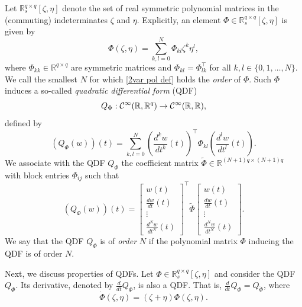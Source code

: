 \documentclass[letterpaper, 10 pt, conference]{ieeeconf}
\theoremstyle{ieeeconf}
\newcommand{\R}{\mathbb{R}}
\begin{document}
Let $\R_s^{q \times q}[\zeta,\eta]$ denote the set of real symmetric polynomial matrices in the (commuting) indeterminates $\zeta$ and $\eta$. Explicitly, an element $\Phi 
\in \R_s^{q \times q}[\zeta,\eta]$ is given by 
\begin{equation}
\Phi(\zeta,\eta)=\sum_{k,l=0}^N\Phi_{kl}\zeta^k\eta^l,
\label{2var pol def}
\end{equation}
where $\Phi_{kk}\in \R^{q \times q}$ are symmetric matrices and $\Phi_{kl}=\Phi_{lk}^\top$ for all ${k,l \in \{0,1,\dots,N\}}$. We call the smallest $N$ for which \eqref{2var pol def} holds
the \emph{order} of $\Phi$. Such $\Phi$ induces a so-called \emph{quadratic differential form} (QDF)
\begin{equation*}
Q_\Phi : \mathcal{C}^\infty (\R,\R^{q}) \to \mathcal{C}^\infty (\R,\R),
\vspace{-1ex}
\end{equation*}
defined by 
\vspace{-1ex}
\begin{equation*}
\left( Q_\Phi(w)\right)(t)=\sum_{k,l=0}^N \left(\frac{d^kw}{dt^k}(t)\right)^\top \Phi_{kl} \left(\frac{d^lw}{dt^l}(t)\right).
\end{equation*}
We associate with the QDF $Q_\Phi$ 
the coefficient matrix ${\tilde{\Phi}\in \R^{(N+1)q \times (N+1)q}}$ with block entries $\Phi_{ij}$
such that \vspace{-0.5ex}
\begin{equation*}
\left(Q_\Phi(w)\right)(t) =  \begin{bmatrix}
	w(t) \\
	\frac{dw}{dt}(t) \\ \vdots \\ \frac{d^Nw}{dt^N}(t)
\end{bmatrix}^\top \tilde{\Phi} \begin{bmatrix}
	w(t) \\
	\frac{dw}{dt}(t) \\ \vdots \\ \frac{d^Nw}{dt^N}(t)
\end{bmatrix}.
\end{equation*}
We say that the QDF $Q_\Phi$ is of \emph{order} $N$ if the polynomial matrix $\Phi$ inducing the QDF is of order $N$. 

Next, we discuss properties of QDFs. Let $\Phi \in \R_s^{q \times q}[\zeta,\eta]$ and consider the QDF $Q_\Phi$. 
Its derivative, denoted by $\frac{d}{dt}Q_\Phi$, is also a QDF. That is, $\frac{d}{dt}Q_\Phi = Q_{\dot{\Phi}}$,
where \[{\dot{\Phi}(\zeta,\eta)=(\zeta+\eta)\Phi(\zeta,\eta)}.\]
\end{document}
